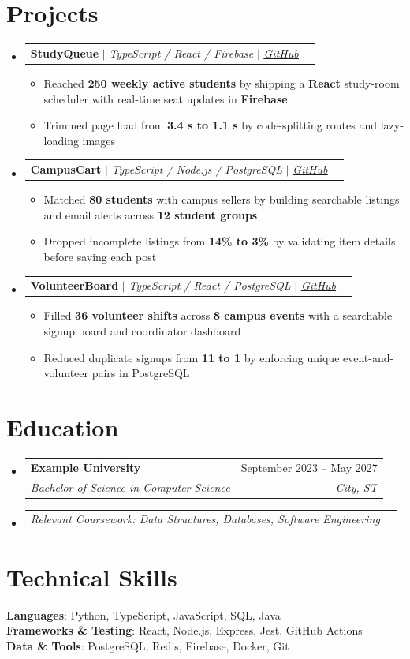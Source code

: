\documentclass[letterpaper,10pt]{article}
\makeatletter
\newcommand{\resumeItem}[1]{
  \item\small{
    {#1}
  }
}
\newcommand{\resumeSubheading}[4]{
  \vspace{0pt}\item
    \begin{tabular*}{0.97\textwidth}[t]{l@{\extracolsep{\fill}}r}
      \textbf{#1} & #2 \\
      \textit{\small#3} & \textit{\small #4} \\
    \end{tabular*}\vspace{-3pt}
}
\newcommand{\resumeSubSubheading}[2]{
    \item
    \begin{tabular*}{0.97\textwidth}{l@{\extracolsep{\fill}}r}
      \textit{\small#1} & \textit{\small #2} \\
    \end{tabular*}\vspace{-7pt}
}
\newcommand{\resumeProjectHeading}[2]{
    \item
    \begin{tabular*}{0.97\textwidth}{l@{\extracolsep{\fill}}r}
      \small#1 & #2 \\
    \end{tabular*}\vspace{-1pt}
}
\newcommand{\resumeSubHeadingListStart}{\begin{itemize}[leftmargin=0.15in, label={}, topsep=0pt, itemsep=0pt, parsep=0pt, partopsep=0pt]}
\newcommand{\resumeSubHeadingListEnd}{\end{itemize}}
\newcommand{\resumeProjectItemListStart}{\begin{itemize}[leftmargin=0.22in, topsep=3pt, itemsep=2pt, parsep=0pt, partopsep=0pt]}
\newcommand{\resumeProjectItemListEnd}{\end{itemize}\vspace{5pt}}
\makeatother
\begin{document}
\section{Projects}
  \resumeSubHeadingListStart
    \resumeProjectHeading
      {\textbf{StudyQueue} $|$ \emph{TypeScript / React / Firebase} $|$ \href{https://github.com/example/studyqueue}{\emph{\underline{GitHub}}}}{}
      \resumeProjectItemListStart
        \resumeItem{Reached \textbf{250 weekly active students} by shipping a \textbf{React} study-room scheduler with real-time seat updates in \textbf{Firebase}}
        \resumeItem{Trimmed page load from \textbf{3.4 s to 1.1 s} by code-splitting routes and lazy-loading images}
      \resumeProjectItemListEnd
    \resumeProjectHeading
      {\textbf{CampusCart} $|$ \emph{TypeScript / Node.js / PostgreSQL} $|$ \href{https://github.com/example/campuscart}{\emph{\underline{GitHub}}}}{}
      \resumeProjectItemListStart
        \resumeItem{Matched \textbf{80 students} with campus sellers by building searchable listings and email alerts across \textbf{12 student groups}}
        \resumeItem{Dropped incomplete listings from \textbf{14\% to 3\%} by validating item details before saving each post}
      \resumeProjectItemListEnd
    \resumeProjectHeading
      {\textbf{VolunteerBoard} $|$ \emph{TypeScript / React / PostgreSQL} $|$ \href{https://github.com/example/volunteerboard}{\emph{\underline{GitHub}}}}{}
      \resumeProjectItemListStart
        \resumeItem{Filled \textbf{36 volunteer shifts} across \textbf{8 campus events} with a searchable signup board and coordinator dashboard}
        \resumeItem{Reduced duplicate signups from \textbf{11 to 1} by enforcing unique event-and-volunteer pairs in PostgreSQL}
      \resumeProjectItemListEnd
\resumeSubHeadingListEnd

\section{Education}
  \resumeSubHeadingListStart
    \resumeSubheading
      {Example University}{September 2023 -- May 2027}
      {Bachelor of Science in Computer Science}{City, ST}
    \resumeSubSubheading
      {Relevant Coursework: Data Structures, Databases, Software Engineering}{}
  \resumeSubHeadingListEnd

\section{Technical Skills}
 \begin{itemize}[leftmargin=0.15in, label={}, topsep=4pt, itemsep=0pt, parsep=0pt, partopsep=0pt]
    \small{\item{
     \textbf{Languages}{: Python, TypeScript, JavaScript, SQL, Java} \\[2pt]
     \textbf{Frameworks \& Testing}{: React, Node.js, Express, Jest, GitHub Actions} \\[2pt]
     \textbf{Data \& Tools}{: PostgreSQL, Redis, Firebase, Docker, Git}
    }}
 \end{itemize}
\end{document}
